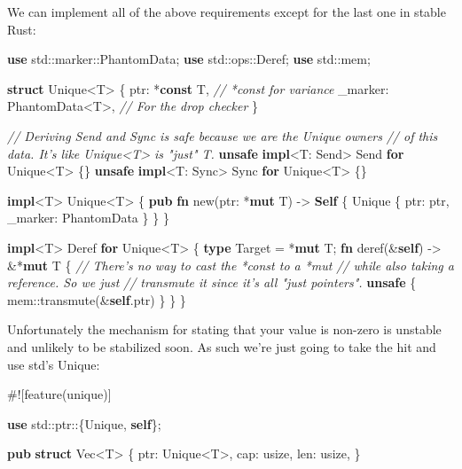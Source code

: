 \documentclass[a4paper,]{book}
\newenvironment{Shaded}{\begin{snugshade}}{\end{snugshade}}
\newcommand{\KeywordTok}[1]{\textcolor[rgb]{0.13,0.29,0.53}{\textbf{{#1}}}}
\newcommand{\DataTypeTok}[1]{\textcolor[rgb]{0.13,0.29,0.53}{{#1}}}
\newcommand{\CommentTok}[1]{\textcolor[rgb]{0.56,0.35,0.01}{\textit{{#1}}}}
\newcommand{\BuiltInTok}[1]{{#1}}
\newcommand{\AttributeTok}[1]{\textcolor[rgb]{0.77,0.63,0.00}{{#1}}}
\newcommand{\NormalTok}[1]{{#1}}
\begin{document}
We can implement all of the above requirements except for the last one
in stable Rust:

\begin{Shaded}
\begin{Highlighting}[]
\KeywordTok{use} \NormalTok{std::marker::PhantomData;}
\KeywordTok{use} \NormalTok{std::ops::Deref;}
\KeywordTok{use} \NormalTok{std::mem;}

\KeywordTok{struct} \NormalTok{Unique<T> \{}
    \NormalTok{ptr: *}\KeywordTok{const} \NormalTok{T,              }\CommentTok{// *const for variance}
    \NormalTok{_marker: PhantomData<T>,    }\CommentTok{// For the drop checker}
\NormalTok{\}}

\CommentTok{// Deriving Send and Sync is safe because we are the Unique owners}
\CommentTok{// of this data. It's like Unique<T> is "just" T.}
\KeywordTok{unsafe} \KeywordTok{impl}\NormalTok{<T: }\BuiltInTok{Send}\NormalTok{> }\BuiltInTok{Send} \KeywordTok{for} \NormalTok{Unique<T> \{\}}
\KeywordTok{unsafe} \KeywordTok{impl}\NormalTok{<T: }\BuiltInTok{Sync}\NormalTok{> }\BuiltInTok{Sync} \KeywordTok{for} \NormalTok{Unique<T> \{\}}

\KeywordTok{impl}\NormalTok{<T> Unique<T> \{}
    \KeywordTok{pub} \KeywordTok{fn} \NormalTok{new(ptr: *}\KeywordTok{mut} \NormalTok{T) -> }\KeywordTok{Self} \NormalTok{\{}
        \NormalTok{Unique \{ ptr: ptr, _marker: PhantomData \}}
    \NormalTok{\}}
\NormalTok{\}}

\KeywordTok{impl}\NormalTok{<T> Deref }\KeywordTok{for} \NormalTok{Unique<T> \{}
    \KeywordTok{type} \NormalTok{Target = *}\KeywordTok{mut} \NormalTok{T;}
    \KeywordTok{fn} \NormalTok{deref(&}\KeywordTok{self}\NormalTok{) -> &*}\KeywordTok{mut} \NormalTok{T \{}
        \CommentTok{// There's no way to cast the *const to a *mut}
        \CommentTok{// while also taking a reference. So we just}
        \CommentTok{// transmute it since it's all "just pointers".}
        \KeywordTok{unsafe} \NormalTok{\{ mem::transmute(&}\KeywordTok{self}\NormalTok{.ptr) \}}
    \NormalTok{\}}
\NormalTok{\}}
\end{Highlighting}
\end{Shaded}

Unfortunately the mechanism for stating that your value is non-zero is
unstable and unlikely to be stabilized soon. As such we're just going to
take the hit and use std's Unique:

\begin{Shaded}
\begin{Highlighting}[]
\AttributeTok{#![}\NormalTok{feature}\AttributeTok{(}\NormalTok{unique}\AttributeTok{)]}

\KeywordTok{use} \NormalTok{std::ptr::\{Unique, }\KeywordTok{self}\NormalTok{\};}

\KeywordTok{pub} \KeywordTok{struct} \DataTypeTok{Vec}\NormalTok{<T> \{}
    \NormalTok{ptr: Unique<T>,}
    \NormalTok{cap: }\DataTypeTok{usize}\NormalTok{,}
    \NormalTok{len: }\DataTypeTok{usize}\NormalTok{,}
\NormalTok{\}}
\end{Highlighting}
\end{Shaded}
\end{document}
